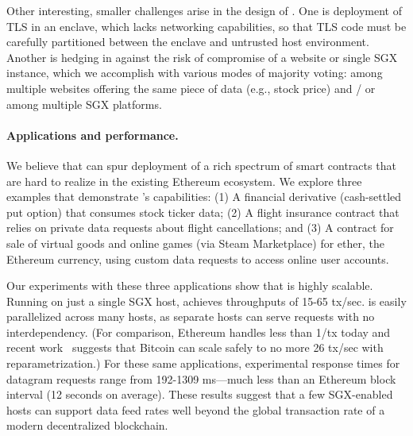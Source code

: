 Other interesting, smaller challenges arise in the design of \tc. One is deployment of TLS in an enclave, which lacks networking capabilities, so that TLS code must be carefully  partitioned between the enclave and untrusted host environment. Another is hedging in \tc against the risk of compromise of a website or single SGX instance, which we accomplish with various modes of majority voting: among multiple websites offering the same piece of data (e.g., stock price) and / or among multiple SGX platforms.

\paragraph{Applications and performance.} 
We believe that \tc can spur deployment of a rich spectrum of smart contracts that are hard to realize in the existing Ethereum ecosystem. We explore three examples that demonstrate \tc's capabilities: (1) A financial derivative (cash-settled put option) that consumes stock ticker data; (2) A flight insurance contract that relies on private data requests about flight cancellations; and (3) A contract for sale of virtual goods and online games (via Steam Marketplace) for ether, the Ethereum currency, using custom data requests to access online user accounts. 

Our experiments with these three applications show that \tc is highly scalable. Running on just a single SGX host, \tc achieves throughputs of 15-65 tx/sec. \tc is easily parallelized across many hosts, as separate \tc hosts can serve requests with no interdependency. (For comparison, Ethereum handles less than 1/tx today and recent work~\cite{blockchainscaling} suggests that Bitcoin can scale safely to no more 26 tx/sec with reparametrization.) For these same applications, experimental response times for datagram requests range from 192-1309 ms---much less than an Ethereum block interval (12 seconds on average). These results suggest that a few SGX-enabled hosts can support \tc data feed rates well beyond the global transaction rate of a modern decentralized blockchain.


